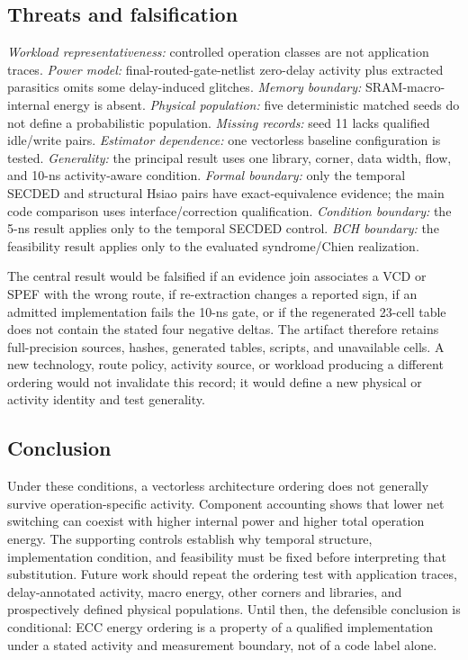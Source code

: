 \documentclass[conference,10pt]{IEEEtran}
\begin{document}
\subsection{Threats and falsification}
\emph{Workload representativeness:} controlled operation classes are not application traces. \emph{Power model:} final-routed-gate-netlist zero-delay activity plus extracted parasitics omits some delay-induced glitches. \emph{Memory boundary:} SRAM-macro-internal energy is absent. \emph{Physical population:} five deterministic matched seeds do not define a probabilistic population. \emph{Missing records:} seed 11 lacks qualified idle/write pairs. \emph{Estimator dependence:} one vectorless baseline configuration is tested. \emph{Generality:} the principal result uses one library, corner, data width, flow, and 10-ns activity-aware condition. \emph{Formal boundary:} only the temporal SECDED and structural Hsiao pairs have exact-equivalence evidence; the main code comparison uses interface/correction qualification. \emph{Condition boundary:} the 5-ns result applies only to the temporal SECDED control. \emph{BCH boundary:} the feasibility result applies only to the evaluated syndrome/Chien realization.

The central result would be falsified if an evidence join associates a VCD or SPEF with the wrong route, if re-extraction changes a reported sign, if an admitted implementation fails the 10-ns gate, or if the regenerated 23-cell table does not contain the stated four negative deltas. The artifact therefore retains full-precision sources, hashes, generated tables, scripts, and unavailable cells. A new technology, route policy, activity source, or workload producing a different ordering would not invalidate this record; it would define a new physical or activity identity and test generality.

\subsection{Conclusion}
Under these conditions, a vectorless architecture ordering does not generally survive operation-specific activity. Component accounting shows that lower net switching can coexist with higher internal power and higher total operation energy. The supporting controls establish why temporal structure, implementation condition, and feasibility must be fixed before interpreting that substitution. Future work should repeat the ordering test with application traces, delay-annotated activity, macro energy, other corners and libraries, and prospectively defined physical populations. Until then, the defensible conclusion is conditional: ECC energy ordering is a property of a qualified implementation under a stated activity and measurement boundary, not of a code label alone.

\clearpage


\end{document}
